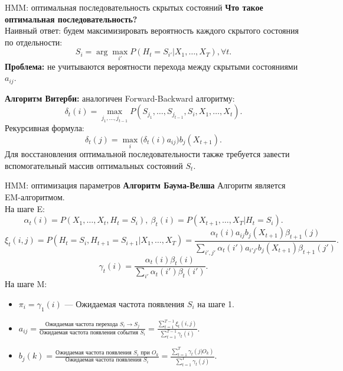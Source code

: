 \begin{frame}{HMM: оптимальная последовательность скрытых состояний}
\textbf{Что такое оптимальная последовательность?}\\
Наивный ответ: будем максимизировать вероятность каждого скрытого состояния по отдельности:
\[
    S_i  = \arg\max_{i'} P(H_t = S_{i'}|X_1,\dots,X_T), \forall t.
\]
\textbf{Проблема:} не учитываются вероятности перехода между скрытыми состояниями $a_{ij}$.

\textbf{Алгоритм Витерби:}
аналогичен Forward-Backward алгоритму:
\[
    \delta_t(i) = \max_{j_1,\dots,j_{t-1}} P(S_{j_1}, \dots,S_{j_{t-1}},S_i, X_1,\dots,X_{t}).
\]
Рекурсивная формула:
\[
    \delta_t(j) = \max_{i} \bigl(\delta_t(i)a_{ij}\bigr)b_j(X_{t+1}).
\]
Для восстановления оптимальной последовательности также требуется завести вспомогательный массив оптимальных состояний $S_t$.
\end{frame}



\begin{frame}{HMM: оптимизация параметров}
\textbf{Алгоритм Баума-Велша}
Алгоритм является EM-алгоритмом.\\
На шаге E:
\[
    \alpha_t(i) = P(X_1,\dots,X_t, H_t = S_i), ~\beta_t(i) =  P(X_{t+1},\dots,X_{T}|H_t = S_i).
\] 
\[
    \xi_t(i,j) = P(H_t= S_i, H_{t+1} = S_{i+1}| X_1,\dots,X_T) = \frac{\alpha_t(i)a_{ij}b_j(X_{t+1})\beta_{t+1}(j)}{\sum_{i',j'}\alpha_t(i')a_{i'j'}b_j(X_{t+1})\beta_{t+1}(j')}.
\]
\[
    \gamma_t(i) = \frac{\alpha_t(i)\beta_t(i)}{\sum_{i'} \alpha_t(i')\beta_t(i')}.
\]
На шаге M:
\begin{itemize}
\item $\pi_i = \gamma_1(i)$ ---  Ожидаемая частота появления $S_i$ на шаге 1.
\item $a_{ij} = \frac{\text{Ожидаемая частота перехода }S_i \to S_j}{\text{Ожидаемая частота появления события } S_i} = \frac{\sum_{t=1}^{T-1}\xi_t(i,j)}{\sum_{t=1}^{T-1}\gamma_t(i)}.$
\item $b_{j}(k) = \frac{\text{Ожидаемая частота появления }S_i \text{ при } O_k}{\text{Ожидаемая частота появления }S_i} = \frac{\sum_{t=1}^{T}\gamma_t(j|O_k)}{\sum_{t=1}^{T}\gamma_t(j)}.$

\end{itemize}
\end{frame}

